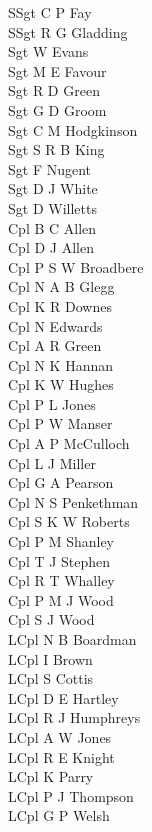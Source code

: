 \documentclass[a4paper,7pt]{book}
\begin{document}
\begin{multicols}{4}
  \scriptsize
  \noindent
  SSgt C P Fay \\
  SSgt R G Gladding \\
  Sgt W Evans \\
  Sgt M E Favour \\
  Sgt R D Green \\
  Sgt G D Groom \\
  Sgt C M Hodgkinson \\
  Sgt S R B King \\
  Sgt F Nugent \\
  Sgt D J White \\
  Sgt D Willetts \\
  Cpl B C Allen \\
  Cpl D J Allen \\
  Cpl P S W Broadbere \\
  Cpl N A B Glegg \\
  Cpl K R Downes \\
  Cpl N Edwards \\
  Cpl A R Green \\
  Cpl N K Hannan \\
  Cpl K W Hughes \\
  Cpl P L Jones \\
  Cpl P W Manser \\
  Cpl A P McCulloch \\
  Cpl L J Miller \\
  Cpl G A Pearson \\
  Cpl N S Penkethman \\
  Cpl S K W Roberts \\
  Cpl P M Shanley \\
  Cpl T J Stephen \\
  Cpl R T Whalley \\
  Cpl P M J Wood \\
  Cpl S J Wood \\
  LCpl N B Boardman \\
  LCpl I Brown \\
  LCpl S Cottis \\
  LCpl D E Hartley \\
  LCpl R J Humphreys \\
  LCpl A W Jones \\
  LCpl R E Knight \\
  LCpl K Parry \\
  LCpl P J Thompson \\
  LCpl G P Welsh \\

\end{multicols}
\end{document}
